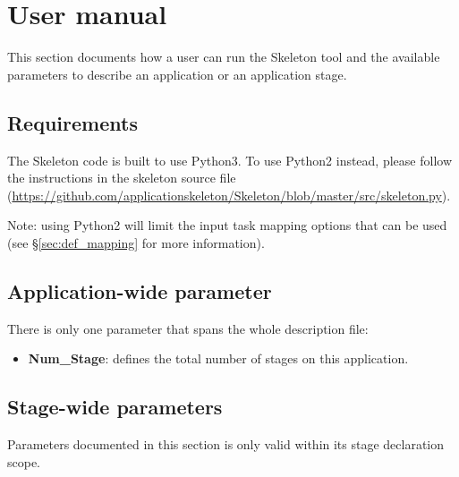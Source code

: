 \documentclass[10pt,a4paper]{article}
\begin{document}
\section{User manual}

This section documents how a user can run the Skeleton tool and the available parameters to describe an application or an application stage.

\subsection{Requirements}

The Skeleton code is built to use Python3.  To use Python2 instead, please follow the instructions in the skeleton source file (\url{https://github.com/applicationskeleton/Skeleton/blob/master/src/skeleton.py}). 

Note: using Python2 will limit the input task mapping options that can be used (see \S\ref{sec:def_mapping} for more information).

\subsection{Application-wide parameter}

There is only one parameter that spans the whole description file:

\begin{itemize}

\item{\textbf{Num\_Stage}:} defines the total number of stages on this application.

\end{itemize}

\subsection{Stage-wide parameters}\label{sec:stage-wide}

Parameters documented in this section is only valid within its stage declaration scope.
\end{document}

